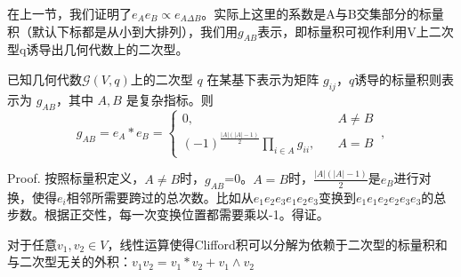 在上一节，我们证明了$e_Ae_B\propto e_{A\Delta B}$。实际上这里的系数是A与B交集部分的标量积（默认下标都是从小到大排列），我们用$g_{AB}$表示，即标量积可视作利用V上二次型q诱导出几何代数上的二次型。
\begin{theorem}{}
已知几何代数$\mathcal {G}(V, q)$上的二次型 $q$ 在某基下表示为矩阵 $g_{ij}$，$q $诱导的标量积则表示为 $g_{AB}$，其中 $A,B$ 是复杂指标。则
\begin{equation}
g_{A B}=e_A*e_B=\left\{\begin{aligned}
0,\quad & A \neq B \\
(-1)^{\frac{|A|(|A|-1)}{2}} \prod_{i \in A} g_{i i}, \quad& A=B
\end{aligned}\right.~,
\end{equation}
\end{theorem}

Proof. 按照标量积定义，$A \neq B$时，$g_{AB}$=0。$A = B$时，$\frac{|A|(|A|-1)}{2}$是$e_B$进行对换，使得$e_i$相邻所需要跨过的总次数。比如从$e_1e_2e_3e_1e_2e_3$变换到$e_1e_1e_2e_2e_3e_3$的总步数。根据正交性，每一次变换位置都需要乘以-1。得证。

对于任意$v_1,v_2\in V$，线性运算使得Clifford积可以分解为依赖于二次型的标量积和与二次型无关的外积：$v_1v_2=v_1* v_2+v_1\wedge v_2$

